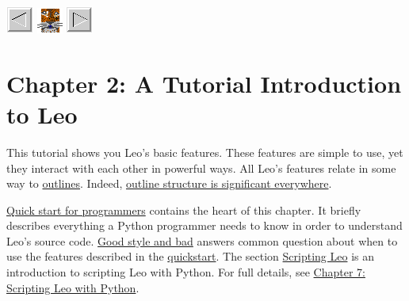 \documentclass[10pt,a4paper,english]{article}
\title{}
\author{}
\date{}
\newlength{\locallinewidth}
\begin{document}
\setlength{\locallinewidth}{\linewidth}

\href{\#back}{\includegraphics{arrow_lt.gif}} \href{\#home}{\includegraphics{leo.gif}} \href{\#next}{\includegraphics{arrow_rt.gif}}



\hypertarget{chapter-2-a-tutorial-introduction-to-leo}{}
\section*{Chapter 2: A Tutorial Introduction to Leo}

This tutorial shows you Leo's basic features.
These features are simple to use, yet they interact with each other in powerful ways.
All Leo's features relate in some way to \href{\#leo-s-main-window}{outlines}.
Indeed, \href{\#outline-structure-is-significant-everywhere}{outline structure is significant everywhere}.

\href{\#quick-start-for-programmers}{Quick start for programmers} contains the heart of this chapter.
It briefly describes everything a Python programmer needs to know in order to understand Leo's source code.
\href{\#good-style-and-bad-sections-vs-others}{Good style and bad} answers common question about when to use the features described in the \href{\#quick-start-for-programmers}{quickstart}.
The section \href{\#scripting-leo}{Scripting Leo} is an introduction to scripting Leo with Python.
For full details, see \href{scripting.html}{Chapter 7: Scripting Leo with Python}.
\hypertarget{contents}{}
\end{document}
